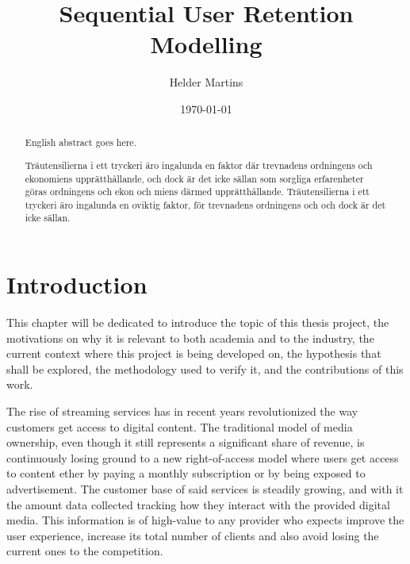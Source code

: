 \documentclass{kththesis}
\title{Sequential User Retention Modelling}
\author{Helder Martins}
\date{\today}
\begin{document}
\flyleaf

\begin{abstract}
  English abstract goes here.
\end{abstract}

\clearpage

\begin{otherlanguage}{swedish}
  \begin{abstract}
    Träutensilierna i ett tryckeri äro ingalunda en faktor där
    trevnadens ordningens och ekonomiens upprätthållande, och dock är
    det icke sällan som sorgliga erfarenheter göras ordningens och
    ekon och miens därmed upprätthållande. Träutensilierna i ett
    tryckeri äro ingalunda en oviktig faktor, för trevnadens
    ordningens och och dock är det icke sällan.
  \end{abstract}
\end{otherlanguage}

\cleardoublepage

\tableofcontents


\mainmatter


\chapter{Introduction}

	This chapter will be dedicated to introduce the topic of this thesis project, the motivations on why it is relevant to both academia and to the industry, the current context where this project is being developed on, the hypothesis that shall be explored, the methodology used to verify it, and the contributions of this work.
	
	The rise of streaming services has in recent years revolutionized the way customers get access to digital content. The traditional model of media ownership, even though it still represents a significant share of revenue, is continuously losing ground to a new right-of-access model where users get access to content ether by paying a monthly subscription or by being exposed to advertisement. The customer base of said services is steadily growing, and with it the amount data collected tracking how they interact with the provided digital media. This information is of high-value to any provider who expects improve the user experience, increase its total number of clients and also avoid losing the current ones to the competition.
	
\end{document}
